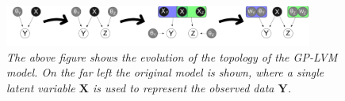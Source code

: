 %
%
%
%
%
%

\begin{figure}
  \begin{center}
    \includegraphics[width=0.9\textwidth]{bin/graphicalmodel.pdf}
  \end{center}
  \caption{\small {\it The above figure shows the evolution of the
      topology of the GP-LVM model. On the far left the original model
      is shown, where a single latent variable $\mathbf{X}$ is used to
      represent the observed data $\mathbf{Y}$. }}
 \label{fig:grModel}
\end{figure}


